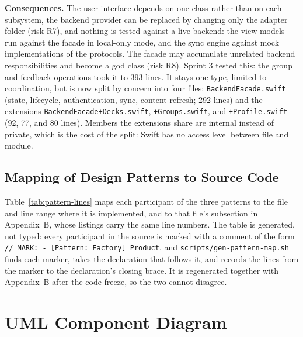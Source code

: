 \documentclass[12pt,letterpaper]{article}
\begin{document}
\textbf{Consequences.} The user interface depends on one class rather than on each
subsystem, the backend provider can be replaced by changing only the adapter folder
(risk R7), and nothing is tested against a live backend: the view models run against
the facade in local-only mode, and the sync engine against mock implementations of the
protocols. The facade may accumulate unrelated backend
responsibilities and become a god class (risk R8). Sprint 3 tested this: the group and
feedback operations took it to 393 lines. It stays one type, limited to coordination,
but is now split by concern into four files: \texttt{BackendFacade.swift} (state,
lifecycle, authentication, sync, content refresh; 292 lines) and the extensions
\texttt{BackendFacade+Decks.swift}, \texttt{+Groups.swift}, and \texttt{+Profile.swift}
(92, 77, and 80 lines). Members the extensions share are internal instead of private,
which is the cost of the split: Swift has no access level between file and module.

\subsection{Mapping of Design Patterns to Source Code}\label{sec:patternmap}
Table~\ref{tab:pattern-lines} maps each participant of the three patterns to the file
and line range where it is implemented, and to that file's subsection in Appendix~B,
whose listings carry the same line numbers. The table is generated, not typed: every
participant in the source is marked with a comment of the form
\texttt{// MARK: - [Pattern: Factory] Product}, and \texttt{scripts/gen-pattern-map.sh}
finds each marker, takes the declaration that follows it, and records the lines from
the marker to the declaration's closing brace. It is regenerated together with
Appendix~B after the code freeze, so the two cannot disagree.

{\singlespacing\footnotesize

}

\section{UML Component Diagram}\label{sec:component}
\end{document}
